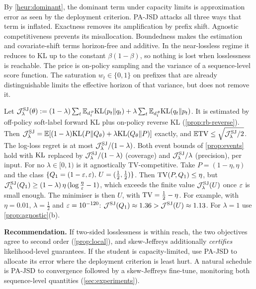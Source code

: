 \begin{remark}
By \cref{heur:dominant}, the dominant term under capacity limits is approximation error as seen by the
deployment criterion. PA-JSD attacks all three ways that term is inflated. Exactness removes its
amplification by prefix shift. Agnostic competitiveness prevents its misallocation. Boundedness makes
the estimation and covariate-shift terms horizon-free and additive. In the near-lossless regime it
reduces to KL up to the constant $\beta(1-\beta)$, so nothing is lost when losslessness is reachable. The
price is on-policy sampling and the variance of a sequence-level score function. The saturation
$w_t\in\{0,1\}$ on prefixes that are already distinguishable limits the effective horizon of that
variance, but does not remove it.
\end{remark}

\begin{proposition}\label{prop:sj}
\Pv\Ck Let $\mathcal{J}^{\mathrm{SJ}}_\lambda(\theta):=(1-\lambda)\sum_t\mathbb{E}_{d^{\,p}_{t}}\mathrm{KL}(p_t\|q_t)+\lambda\sum_t\mathbb{E}_{d^{\,\theta}_{t}}\mathrm{KL}(q_t\|p_t)$. It is
estimated by off-policy soft-label forward KL plus on-policy reverse KL (\cref{prop:rb-reverse}). Then
$\mathcal{J}^{\mathrm{SJ}}_\lambda=\mathbb{E}[(1-\lambda)\mathrm{KL}(P\|Q_\theta)+\lambda\mathrm{KL}(Q_\theta\|P)]$ exactly, and
$\mathbb{E}\mathrm{TV}\le\sqrt{\mathcal{J}^{\mathrm{SJ}}_\lambda/2}$. The log-loss regret is at most $\mathcal{J}^{\mathrm{SJ}}_\lambda/(1-\lambda)$.
Both event bounds of \cref{prop:events} hold with $\mathrm{KL}$ replaced by $\mathcal{J}^{\mathrm{SJ}}_\lambda/(1-\lambda)$
(coverage) and $\mathcal{J}^{\mathrm{SJ}}_\lambda/\lambda$ (precision), per input. For no $\lambda\in[0,1)$ is it agnostically
TV-competitive. Take $P=(1-\eta,\eta)$ and the class $\{Q_1=(1-\varepsilon,\varepsilon),\,U=(\frac12,\frac12)\}$. Then
$\mathrm{TV}(P,Q_1)\le\eta$, but $\mathcal{J}^{\mathrm{SJ}}_\lambda(Q_1)\ge(1-\lambda)\,\eta\,(\log\frac\eta{\varepsilon}-1)$, which exceeds the finite value
$\mathcal{J}^{\mathrm{SJ}}_\lambda(U)$ once $\varepsilon$ is small enough. The minimiser is then $U$, with $\mathrm{TV}=\frac12-\eta$. For
example, with $\eta=0.01$, $\lambda=\frac12$ and $\varepsilon=10^{-120}$: $\mathcal{J}^{\mathrm{SJ}}(Q_1)\approx1.36>\mathcal{J}^{\mathrm{SJ}}(U)\approx1.13$. For
$\lambda=1$ use \cref{prop:agnostic}(b).
\end{proposition}
\noindent
\textbf{Recommendation.} If two-sided losslessness is within reach, the two objectives agree to second
order (\cref{prop:local}), and skew-Jeffreys additionally \emph{certifies} likelihood-level guarantees.
If the student is capacity-limited, use PA-JSD to allocate its error where the deployment criterion is
least hurt. A natural schedule is PA-JSD to convergence followed by a skew-Jeffreys fine-tune, monitoring
both sequence-level quantities (\cref{sec:experiments}).



